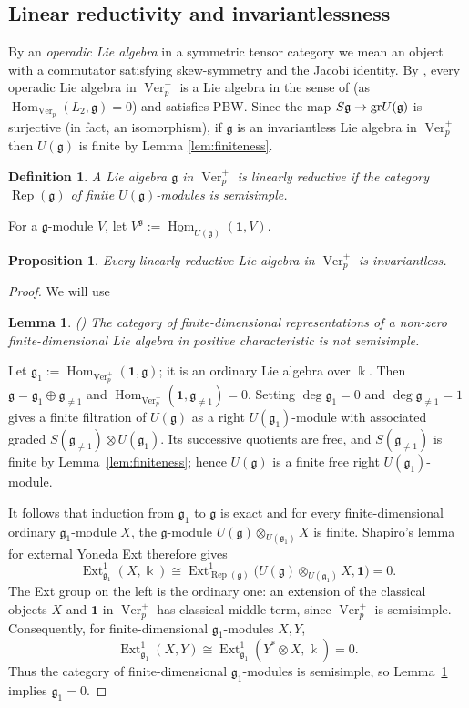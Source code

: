 \documentclass[12pt]{amsart}
\newtheorem{proposition}[theorem]{Proposition}
\newtheorem{lemma}[theorem]{Lemma}
\newtheorem{definition}[theorem]{Definition}
\theoremstyle{remark}
\DeclareMathOperator{\Ver}{Ver}
\DeclareMathOperator{\Rep}{Rep}
\DeclareMathOperator{\Hom}{Hom}
\DeclareMathOperator{\Ext}{Ext}
\newcommand{\kk}{\Bbbk}
\newcommand{\g}{\mathfrak g}
\newcommand{\one}{\mathbf 1}
\newcommand{\uHom}{\underline{\Hom}}
\begin{document}
\subsection{Linear reductivity and invariantlessness}
\label{subsec:classical-part}

By an {\it operadic Lie algebra} in a symmetric tensor category we mean an object with a commutator satisfying skew-symmetry and the Jacobi identity. By \cite[Theorem~6.6]{Eti18}, every operadic Lie algebra 
in $\Ver_p^+$ is a Lie algebra in the sense of \cite[Definition~4.6]{Eti18} (as $\Hom_{\Ver_p}(L_2,\g)=0$) and satisfies PBW. Since the map $S\g\to {\rm gr}U(\g)$ is surjective (in fact, an isomorphism), 
 if $\g$ is an invariantless Lie algebra in
$\Ver_p^+$ then $U(\g)$ is finite by Lemma \ref{lem:finiteness}.

\begin{definition}\label{def:linear-reductive}
A Lie algebra $\g$ in $\Ver_p^+$ is \emph{linearly reductive} if the category
$\Rep(\g)$ of finite $U(\g)$-modules is semisimple. 
\end{definition}

 For a $\g$-module $V$,
let $V^{\g}:=\uHom_{U(\g)}(\one,V)$. 

\begin{proposition}\label{prop:LR-invariantless}
Every linearly reductive Lie algebra in $\Ver_p^+$ is invariantless.
\end{proposition}

\begin{proof} We will use 

\begin{lemma}\label{lem:ordinary-not-semisimple} (\cite[Theorem~8, p.~30]{Zas54})
The category of finite-dimensional representations of a non-zero finite-dimensional Lie algebra in positive characteristic is not semisimple.
\end{lemma}

Let $\g_1:=\Hom_{\Ver_p^+}(\one,\g)$; it is an ordinary Lie algebra over $\kk$.
Then $\g=\g_1\oplus\g_{\ne 1}$ and $\Hom_{\Ver_p^+}(\one,\g_{\ne 1})=0$.
Setting $\deg \g_1=0$ and $\deg \g_{\ne 1}=1$ gives a finite filtration of
$U(\g)$ as a right $U(\g_1)$-module with associated graded
$S(\g_{\ne 1})\otimes U(\g_1)$. 
Its successive quotients are free, and $S(\g_{\ne 1})$ is finite by
Lemma~\ref{lem:finiteness}; hence $U(\g)$ is a finite free right
$U(\g_1)$-module.

It follows that induction from $\g_1$ to $\g$ is exact and for every finite-dimensional ordinary $\g_1$-module $X$, the $\g$-module $U(\g)\otimes_{U(\g_1)}X$ is finite.  Shapiro's lemma for external Yoneda
Ext therefore gives
\[
 \Ext^1_{\g_1}(X,\kk)
 \cong
 \Ext^1_{\Rep(\g)}
 \bigl(U(\g)\otimes_{U(\g_1)}X,\one\bigr)=0.
\]
The Ext group on the left is the ordinary one: an extension of the classical
objects $X$ and $\one$ in $\Ver_p^+$ has classical middle term, since
$\Ver_p^+$ is semisimple.  Consequently, for finite-dimensional
$\g_1$-modules $X,Y$,
\[
 \Ext^1_{\g_1}(X,Y)
 \cong \Ext^1_{\g_1}(Y^*\otimes X,\kk)=0.
\]
Thus the category of finite-dimensional $\g_1$-modules is semisimple, so
Lemma~\ref{lem:ordinary-not-semisimple} implies $\g_1=0$.
\end{proof}
\end{document}
